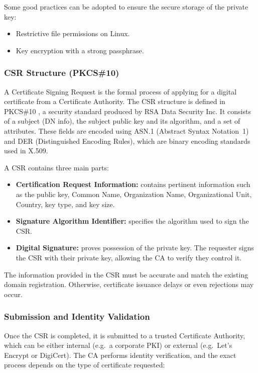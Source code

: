 \documentclass[10pt,twocolumn]{article}
\begin{document}
Some good practices can be adopted to ensure the secure storage of the private
key:

\begin{itemize}
  \item Restrictive file permissions on Linux.
  \item Key encryption with a strong passphrase.
\end{itemize}

\subsubsection{CSR Structure (PKCS\#10)}

A Certificate Signing Request is the formal process of applying for a digital
certificate from a Certificate Authority. The CSR structure is defined in
PKCS\#10 \cite{pkcs10}, a security standard produced by RSA Data Security
Inc. It consists of a subject (DN info), the subject public key and its
algorithm, and a set of attributes. These fields are encoded using ASN.1
(Abstract Syntax Notation~1) and DER (Distinguished Encoding Rules), which
are binary encoding standards used in X.509.

A CSR contains three main parts:

\begin{itemize}
  \item \textbf{Certification Request Information:} contains pertinent
        information such as the public key, Common Name, Organization Name,
        Organizational Unit, Country, key type, and key size.
  \item \textbf{Signature Algorithm Identifier:} specifies the algorithm used
        to sign the CSR.
  \item \textbf{Digital Signature:} proves possession of the private key. The
        requester signs the CSR with their private key, allowing the CA to
        verify they control it.
\end{itemize}

The information provided in the CSR must be accurate and match the existing
domain registration. Otherwise, certificate issuance delays or even rejections
may occur.

\subsubsection{Submission and Identity Validation}

Once the CSR is completed, it is submitted to a trusted Certificate Authority,
which can be either internal (e.g.\ a corporate PKI) or external (e.g.\
Let's Encrypt or DigiCert). The CA performs identity verification, and the
exact process depends on the type of certificate requested:
\end{document}

